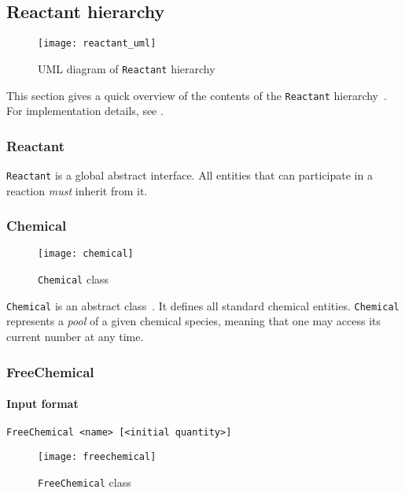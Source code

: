 
\subsection{Reactant hierarchy}

\begin{figure}[!h]
  \centering
  \texttt{[image: reactant\_uml]}
  \caption{UML diagram of \texttt{Reactant} hierarchy}
\label{fig:reactant_uml}
\end{figure}

This section gives a quick overview of the contents of the \texttt{Reactant}
hierarchy~.
For implementation details, see .

\subsubsection{Reactant}

\texttt{Reactant} is a global abstract interface.
All entities that can participate in a reaction \emph{must} inherit from it.

\subsubsection{Chemical}

\begin{figure}[!h]
  \centering
  \texttt{[image: chemical]}
  \caption{\texttt{Chemical} class}
\label{fig:chemical}
\end{figure}

\texttt{Chemical} is an abstract class~.
It defines all standard chemical entities.
\texttt{Chemical} represents a \emph{pool} of a given chemical species,
meaning that one may access its current number at any time.

\subsubsection{FreeChemical}

\paragraph{Input format}
\begin{verbatim}
FreeChemical <name> [<initial quantity>]
\end{verbatim}

\begin{figure}[!h]
  \centering
  \texttt{[image: freechemical]}
  \caption{\texttt{FreeChemical} class}
\label{fig:free_chemical}
\end{figure}

